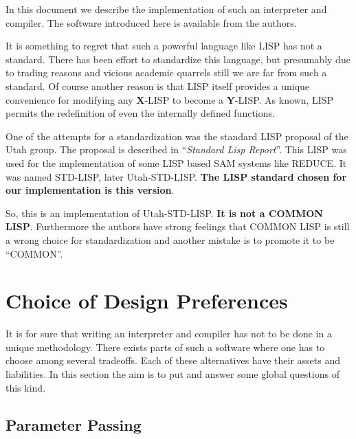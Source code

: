 In  this document we describe the implementation of such an interpreter and
compiler. The software introduced here is available from the authors.

It is something to regret that such a powerful language like LISP has not a
standard.  There  has  been  effort  to  standardize  this  language,   but
presumably  due  to  trading reasons and vicious academic quarrels still we
are far from such a standard. Of course another reason is that LISP  itself
provides a unique convenience for modifying any {\bf X}-LISP  to  become  a
{\bf  Y}-LISP.  As  known,  LISP  permits  the  redefinition  of  even  the
internally defined functions.

One of the attempts for a standardization was the standard LISP proposal of
the Utah group. The proposal is described in
``{\em Standard Lisp Report}''\cite{std}.
This  LISP  was
used  for the implementation of some LISP based SAM systems like REDUCE. It
was  named  STD-LISP,  later  Utah-STD-LISP. {\bf The LISP standard chosen
for our implementation is this version}.

So, this is an implementation of Utah-STD-LISP. {\bf It is not
a COMMON LISP}. Furthermore the authors have strong feelings that
COMMON LISP is still a wrong choice for  standardization and
another mistake is to promote it to be ``COMMON''.





\section{Choice of Design Preferences}
It is for sure that writing an interpreter and compiler has not to be  done
in  a  unique  methodology. There exists parts of such a software where one
has to choose among several tradeoffs.  Each  of  these  alternatives  have
their  assets and liabilities. In this section the aim is to put and answer
some global questions of this kind.

\subsection{Parameter Passing}

